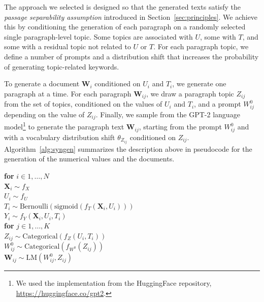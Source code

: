 \documentclass[11pt]{article}
\begin{document}
The approach we selected is designed so that the generated texts satisfy the \emph{passage separability assumption} introduced in Section~\ref{sec:principles}.
%
%
%
We achieve this by conditioning the generation of each paragraph on a randomly selected single paragraph-level topic.
Some topics are associated with $U$, some
with $T$, and some with a residual topic not related to $U$ or $T$. For
each paragraph topic, we define a number of
prompts and a distribution shift that increases the
probability of generating topic-related keywords.

To generate a document $\bm{W}_i$ conditioned on $U_i$ and $T_i$, we generate one paragraph at a time.
For each paragraph $\bm{W}_{ij}$, we draw a paragraph topic $Z_{ij}$ from the set of topics, conditioned on the values of $U_i$ and $T_i$, and a
prompt $W^0_{ij}$ depending on the value of $Z_{ij}$.
%
Finally, we sample from the GPT-2 language model\footnote{We used the implementation from the HuggingFace repository, \url{https://huggingface.co/gpt2}.} to generate the paragraph text $\bm{W}_{ij}$, starting from the prompt $W^0_{ij}$ and with a vocabulary distribution shift $\theta_{Z_{ij}}$ conditioned on $Z_{ij}$.
%
Algorithm~\ref{alg:syngen} summarizes the description above in pseudocode for the generation of the numerical values and the documents.

\begin{algorithm}
\caption{Generation of synthetic data.\label{alg:syngen}}
\begin{tabbing}
\hspace{1mm}\textbf{for} $i \in 1, \ldots, N$\\
\hspace{5mm}$\bm{X}_i \sim f_X$\\
\hspace{5mm}$U_i \sim f_U$\\
\hspace{5mm}$T_i \sim \text{Bernoulli}(\text{sigmoid}(f_T(\bm{X}_i, U_i)))$\\
\hspace{5mm}$Y_i \sim f_Y(\bm{X}_i, U_i, T_i)$\\
\hspace{5mm}\textbf{for} $j \in 1, \ldots, K$\\
\hspace{9mm}$Z_{ij} \sim \text{Categorical}(f_{Z}(U_i, T_i))$\\
\hspace{9mm}$W^0_{ij} \sim \text{Categorical}(f_{W^0}(Z_{ij}))$\\
\hspace{9mm}$\bm{W}_{ij} \sim \text{LM}(W^0_{ij}, Z_{ij})$
\end{tabbing}
\end{algorithm}
\end{document}
